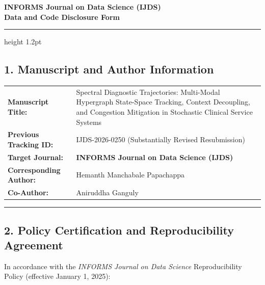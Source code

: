 \documentclass[11pt,letterpaper]{article}
\begin{document}
\begin{center}
    {\Large \textbf{INFORMS Journal on Data Science (IJDS)}}\\[3pt]
    {\large \textbf{Data and Code Disclosure Form}}
\end{center}

\vspace{-4pt}
\hrule height 1.2pt
\vspace{6pt}

\subsection*{1. Manuscript and Author Information}

\begin{tabularx}{\textwidth}{@{}l X@{}}
    \textbf{Manuscript Title:} & Spectral Diagnostic Trajectories: Multi-Modal Hypergraph State-Space Tracking, Context Decoupling, and Congestion Mitigation in Stochastic Clinical Service Systems \\
    \addlinespace[2pt]
    \textbf{Previous Tracking ID:} & IJDS-2026-0250 (Substantially Revised Resubmission) \\
    \addlinespace[2pt]
    \textbf{Target Journal:} & \textbf{INFORMS Journal on Data Science (IJDS)} \\
    \addlinespace[2pt]
    \textbf{Corresponding Author:} & Hemanth Manchabale Papachappa \\
    \addlinespace[2pt]
    \textbf{Co-Author:} & Aniruddha Ganguly \\
\end{tabularx}

\vspace{4pt}
\hrule
\vspace{4pt}

\subsection*{2. Policy Certification and Reproducibility Agreement}

In accordance with the \textit{INFORMS Journal on Data Science} Reproducibility Policy (effective January 1, 2025):
\end{document}
